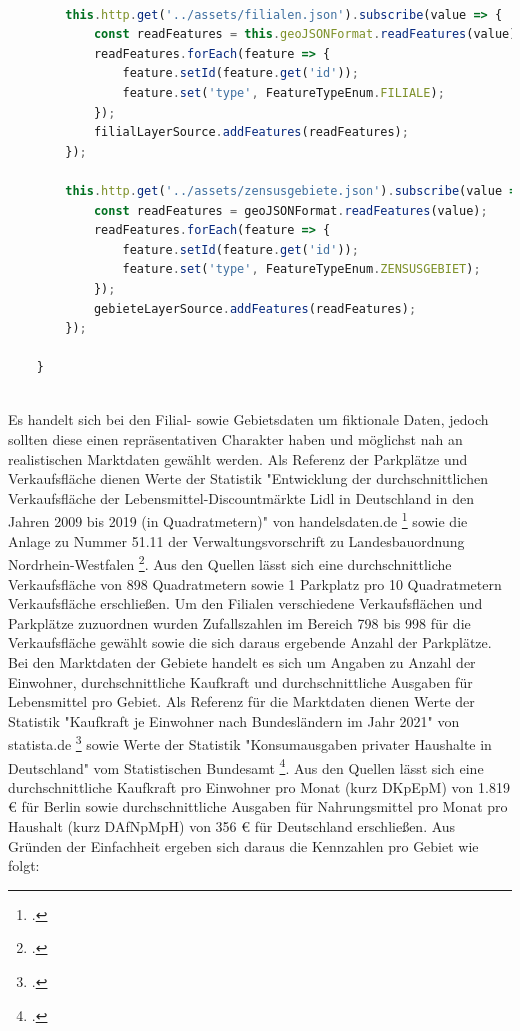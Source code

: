 \begin{lstlisting}[language=JavaScript, caption={Laden der GeoJSON-Dateien der Filialen und Gebiete}]

		this.http.get('../assets/filialen.json').subscribe(value => {
			const readFeatures = this.geoJSONFormat.readFeatures(value);
			readFeatures.forEach(feature => {
				feature.setId(feature.get('id'));
				feature.set('type', FeatureTypeEnum.FILIALE);
			});
			filialLayerSource.addFeatures(readFeatures);
		});

		this.http.get('../assets/zensusgebiete.json').subscribe(value => {
			const readFeatures = geoJSONFormat.readFeatures(value);
			readFeatures.forEach(feature => {
				feature.setId(feature.get('id'));
				feature.set('type', FeatureTypeEnum.ZENSUSGEBIET);
			});
			gebieteLayerSource.addFeatures(readFeatures);
		});
		
	}		
	
\end{lstlisting}

Es handelt sich bei den Filial- sowie Gebietsdaten um fiktionale Daten, jedoch sollten diese einen repräsentativen Charakter haben und möglichst nah an realistischen Marktdaten gewählt werden.
Als Referenz der Parkplätze und Verkaufsfläche dienen Werte der Statistik "Entwicklung der durchschnittlichen Verkaufsfläche der Lebensmittel-Discountmärkte Lidl in Deutschland in den Jahren 2009 bis 2019 (in Quadratmetern)" von handelsdaten.de \footcite{handelsdaten_lidl} sowie die Anlage zu Nummer 51.11 der Verwaltungsvorschrift zu Landesbauordnung Nordrhein-Westfalen \footcite{bauo_5111}.
Aus den Quellen lässt sich eine durchschnittliche Verkaufsfläche von 898 Quadratmetern sowie 1 Parkplatz pro 10 Quadratmetern Verkaufsfläche erschließen.
Um den Filialen verschiedene Verkaufsflächen und Parkplätze zuzuordnen wurden Zufallszahlen im Bereich 798 bis 998 für die Verkaufsfläche gewählt sowie die sich daraus ergebende Anzahl der Parkplätze.\\
Bei den Marktdaten der Gebiete handelt es sich um Angaben zu Anzahl der Einwohner, durchschnittliche Kaufkraft und durchschnittliche Ausgaben für Lebensmittel pro Gebiet.
Als Referenz für die Marktdaten dienen Werte der Statistik "Kaufkraft je Einwohner nach Bundesländern im Jahr 2021" von statista.de \footcite{statista_gfk} sowie Werte der Statistik "Konsumausgaben privater Haushalte in Deutschland" vom Statistischen Bundesamt \footcite{destatis_konsumausgaben}.
Aus den Quellen lässt sich eine durchschnittliche Kaufkraft pro Einwohner pro Monat (kurz DKpEpM) von 1.819 € für Berlin sowie durchschnittliche Ausgaben für Nahrungsmittel pro Monat pro Haushalt (kurz DAfNpMpH) von 356 € für Deutschland erschließen. 
Aus Gründen der Einfachheit ergeben sich daraus die Kennzahlen pro Gebiet wie folgt:

